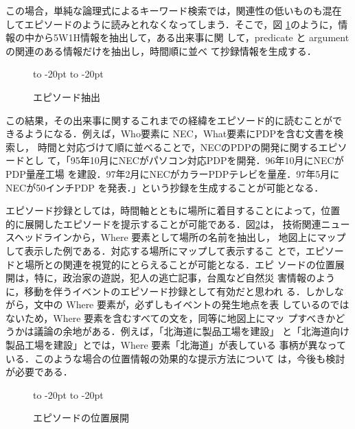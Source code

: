 この場合，単純な論理式によるキーワード検索では，関連性の低いものも混在
してエピソードのように読みとれなくなってしまう．そこで，図
\ref{episode2}のように，情報の中から5W1H情報を抽出して，ある出来事に関
して，predicate と argument の関連のある情報だけを抽出し，時間順に並べ
て抄録情報を生成する．

\begin{figure}[tbp]
  \vspace*{-6pt}
  \begin{center}
    \leavevmode
    \hbox to -20pt{\hss}
    \hbox to -20pt{\hss}
    \vspace*{-7pt}
    \caption{エピソード抽出}
    \vspace*{-6pt}
    \label{episode2}
  \end{center}
\end{figure}

この結果，その出来事に関するこれまでの経緯をエピソード的に読むことがで
きるようになる．例えば，Who要素に NEC，What要素にPDPを含む文書を検索し，
時間と対応づけて順に並べることで，NECのPDPの開発に関するエピソードとし
て，「95年10月にNECがパソコン対応PDPを開発．96年10月にNECがPDP量産工場
を建設．97年2月にNECがカラーPDPテレビを量産．97年5月にNECが50インチPDP
を発表．」という抄録を生成することが可能となる．

エピソード抄録としては，時間軸とともに場所に着目することによって，位置
的に展開したエピソードを提示することが可能である．図\ref{episomap}は，
技術関連ニュースヘッドラインから，Where 要素として場所の名前を抽出し，
地図上にマップして表示した例である．対応する場所にマップして表示するこ
とで，エピソードと場所との関連を視覚的にとらえることが可能となる．エピ
ソードの位置展開は，特に，政治家の遊説，犯人の逃亡記事，台風など自然災
害情報のように，移動を伴うイベントのエピソード抄録として有効だと思われ
る．しかしながら，文中の Where 要素が，必ずしもイベントの発生地点を表
しているのではないため，Where 要素を含むすべての文を，同等に地図上にマッ
プすべきかどうかは議論の余地がある．例えば，「北海道に製品工場を建設」
と「北海道向け製品工場を建設」とでは，Where 要素「北海道」が表している
事柄が異なっている．このような場合の位置情報の効果的な提示方法について
は，今後も検討が必要である．

\begin{figure}[tbp]
  \vspace*{-6pt}
  \begin{center}
    \leavevmode
    \hbox to -20pt{\hss}
    \hbox to -20pt{\hss}
    \vspace*{-7pt}
    \caption{エピソードの位置展開}
    \vspace*{-6pt}
    \label{episomap}
  \end{center}
\end{figure}

